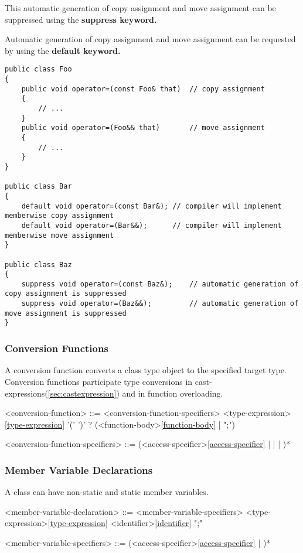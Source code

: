 \documentclass[a4paper,oneside,11pt]{article}
\begin{document}
This automatic generation of copy assignment and move assignment can be suppressed using the
\bf{suppress} keyword.

Automatic generation of copy assignment and move assignment can be requested by using the \bf{default} keyword.

\begin{lstlisting}[frame=trBL]
public class Foo
{
    public void operator=(const Foo& that)  // copy assignment
    {
        // ...
    }
    public void operator=(Foo&& that)       // move assignment
    {
        // ...
    }
}

public class Bar
{
    default void operator=(const Bar&); // compiler will implement memberwise copy assignment
    default void operator=(Bar&&);      // compiler will implement memberwise move assignment
}

public class Baz
{
    suppress void operator=(const Baz&);    // automatic generation of copy assignment is suppressed
    suppress void operator=(Baz&&);         // automatic generation of move assignment is suppressed
}
\end{lstlisting}

\subsubsection{Conversion Functions}\label{sec:conversionfunctions}

A conversion function converts a class type object to the specified target type.
Conversion functions participate type conversions in cast-expressions(\ref{sec:castexpression}) and in function overloading.

\begin{grammar}
\label{conversion-function}<conversion-function> ::= <conversion-function-specifiers> 
<type-expression>\ref{type-expression} '(' ')' ? (<function-body>\ref{function-body} | ";")

<conversion-function-specifiers> ::= (<access-specifier>\ref{access-specifier} |  |  | )*
\end{grammar}

\subsubsection{Member Variable Declarations}

A class can have non-static and static member variables.

\begin{grammar}
\label{member-variable-declaration}<member-variable-declaration> ::= <member-variable-specifiers> <type-expression>\ref{type-expression} <identifier>\ref{identifier} ";"

<member-variable-specifiers> ::= (<access-specifier>\ref{access-specifier} | )*
\end{grammar}
\end{document}
